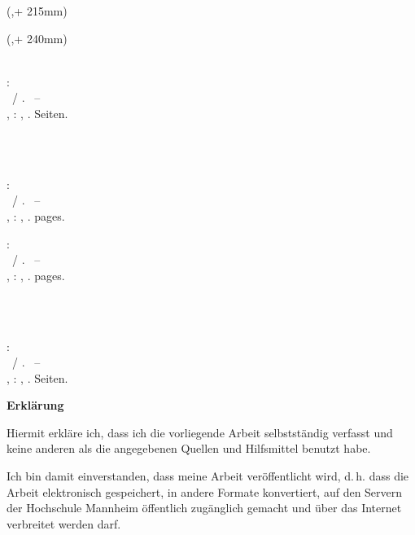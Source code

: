 \begin{textblock*}{\seitenbreite}(\bindekorrektur,\seitenanfang + 215mm)
  \centering\large 
\end{textblock*}

\begin{textblock*}{\seitenbreite}(\bindekorrektur,\seitenanfang + 240mm)
  \centering\large\sffamily
  \dhbwtutor \\
  \vspace{2mm}
  \dhbwbetreuer\\
  \vspace{2mm}
  \dhbwzweitkorrektor
\end{textblock*}

\null\newpage
\thispagestyle{empty}
  
\newcommand{\dhbwbibde}{\begin{small}\textbf{\dhbwautorbib}: \\ \dhbwtitelde \ / \dhbwautor. \ -- \\ \dhbwtypde, \dhbwort : \dhbwkoerperschaftde, \dhbwjahr. \pageref{lastpage} Seiten.\end{small}}

\newcommand{\dhbwbiben}{\begin{small}\textbf{\dhbwautorbib}: \\ \dhbwtitelen \ / \dhbwautor. \ -- \\ \dhbwtypen, \dhbwort : \dhbwkoerperschaften, \dhbwjahr. \pageref{lastpage} pages. \end{small}}

%
  {\dhbwbibde \\ \vspace{0.5cm} \\ \dhbwbiben}
  {\dhbwbiben \\ \vspace{0.5cm} \\ \dhbwbibde}


\clearpage\setcounter{page}{1}
\thispagestyle{empty}
\textsf{\large\textbf{Erklärung}}

Hiermit erkläre ich, dass ich die vorliegende Arbeit selbstständig verfasst und keine anderen als die angegebenen Quellen und Hilfsmittel benutzt habe.

%
{
\vspace{0.5cm}
Ich bin damit einverstanden, dass meine Arbeit veröffentlicht wird, d.\,h. dass die Arbeit elektronisch gespeichert, in andere Formate konvertiert, auf den Servern der Hochschule Mannheim öffentlich zugänglich gemacht und über das Internet verbreitet werden darf. 
}{}%


